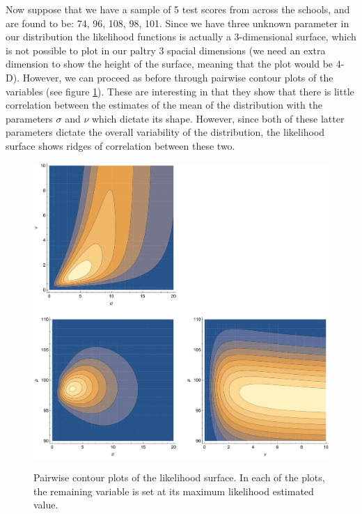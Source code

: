 \documentclass[11pt,fullpage]{book}
\begin{document}
Now suppose that we have a sample of 5 test scores from across the schools, and are found to be: {74, 96, 108, 98, 101}. Since we have three unknown parameter in our distribution the likelihood functions is actually a 3-dimensional surface, which is not possible to plot in our paltry 3 spacial dimensions (we need an extra dimension to show the height of the surface, meaning that the plot would be 4-D). However, we can proceed as before through pairwise contour plots of the variables (see figure \ref{fig:Distributions_tArithmeticLikelihood}). These are interesting in that they show that there is little correlation between the estimates of the mean of the distribution with the parameters $\sigma$ and $\nu$ which dictate its shape. However, since both of these latter parameters dictate the overall variability of the distribution, the likelihood surface shows ridges of correlation between these two.

\begin{figure}
\centering
\scalebox{0.5} 
{\includegraphics{Distributions_tArithmeticLikelihood.pdf}}
\caption{Pairwise contour plots of the likelihood surface. In each of the plots, the remaining variable is set at its maximum likelihood estimated value.}\label{fig:Distributions_tArithmeticLikelihood}
\end{figure}
\end{document}
